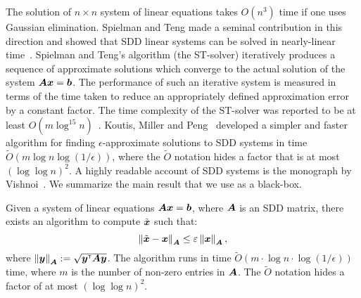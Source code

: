 The solution of $n \times n$ system of linear equations takes $O(n^3)$ time 
if one uses Gaussian elimination. Spielman and Teng made a seminal contribution in this direction and 
showed that SDD linear systems can be solved in nearly-linear 
time~\cite{ST04,EEST05,ST08}. Spielman and Teng's algorithm (the ST-solver)
iteratively produces a sequence of approximate solutions which converge to the 
actual solution of the system $\boldsymbol{A} \boldsymbol{x} = \boldsymbol{b}$. The performance 
of such an iterative system is measured in terms of the time taken to reduce 
an appropriately defined approximation error by a constant factor. The time 
complexity of the ST-solver was reported to be at least $O(m \log^{15} n)$~\cite{KMP11}.  
Koutis, Miller and Peng~\cite{KMP10,KMP11} developed a simpler and faster algorithm 
for finding $\epsilon$-approximate solutions to SDD systems in time 
$\tilde{O}(m \log n \log (1/\epsilon) )$, where the $\tilde{O}$ notation hides 
a factor that is at most $(\log \log n)^2$. A highly readable account 
of SDD systems is the monograph by Vishnoi~\cite{Vis13}. We summarize the 
main result that we use as a black-box.  
\begin{proposition} \label{prop:SDD_systems} {{\rm \cite{KMP11,Vis13}}}
	Given a system of linear equations $\boldsymbol{A} \boldsymbol{x} = \boldsymbol{b}$, where $\boldsymbol{A}$
	is an SDD matrix, there exists an algorithm to compute $\tilde{\boldsymbol{x}}$  
	such that:
		\[
			\left \| \tilde{\boldsymbol{x}} - \boldsymbol{x} \right \|_{\boldsymbol{A}} \leq \varepsilon \left \| \boldsymbol{x} \right \|_{\boldsymbol{A}}, 
		\]
	where $\left \| \boldsymbol{y} \right \|_{\boldsymbol{A}} := \sqrt{{\boldsymbol{y}}^{\scriptscriptstyle \mathsf{T}} \boldsymbol{A} \boldsymbol{y}}$. The algorithm runs in 
	time $\tilde{O}(m \cdot \log n \cdot \log (1 / \epsilon) )$ time, where $m$ is the number of non-zero 
	entries in $\boldsymbol{A}$. The $\tilde{O}$ notation hides a factor of at most $(\log \log n)^2$.
\end{proposition} 


